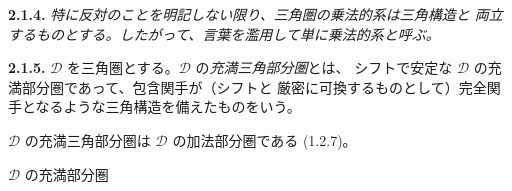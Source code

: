 \medskip
\noindent\textbf{2.1.4.}\quad
{}
\emph{特に反対のことを明記しない限り、三角圏の乗法的系は三角構造と
両立するものとする。したがって、言葉を濫用して単に乗法的系と呼ぶ。}

\medskip
\noindent\textbf{2.1.5.}\quad
{}
$\mathcal D$ を三角圏とする。$\mathcal D$ の\emph{充満三角部分圏}とは、
シフトで安定な $\mathcal D$ の充満部分圏であって、包含関手が（シフトと
厳密に可換するものとして）完全関手となるような三角構造を備えたものをいう。

$\mathcal D$ の充満三角部分圏は $\mathcal D$ の加法部分圏である (1.2.7)。

$\mathcal D$ の充満部分圏
\endgroup
